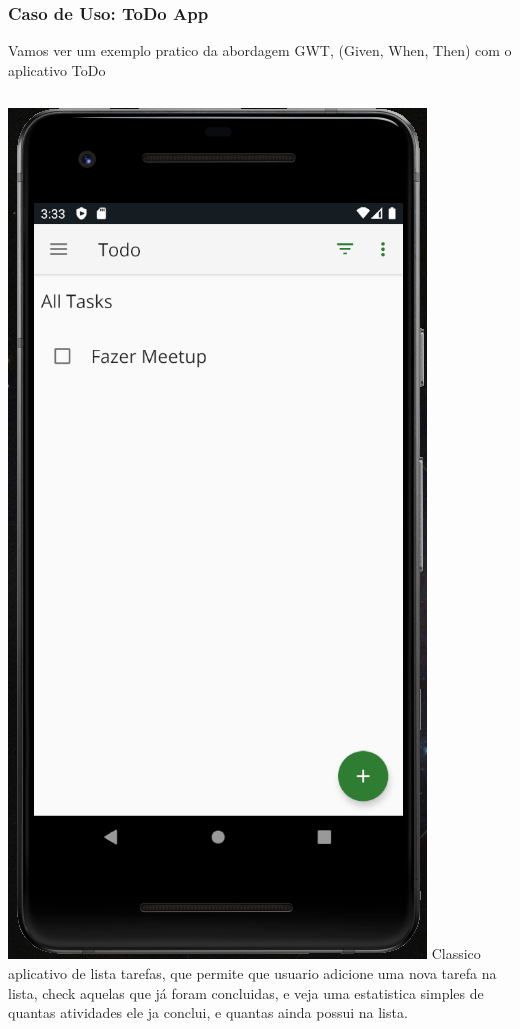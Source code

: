 \documentclass{beamer}
\begin{document}
\begin{frame}
	\frametitle{Caso de Uso: ToDo App}
	Vamos ver um exemplo pratico da abordagem GWT, (Given, When, Then) com o aplicativo ToDo
	\begin{columns}[c]
		
		\includegraphics[scale=0.3]{toDoAppSample}
		Classico aplicativo de lista tarefas, que permite que usuario adicione uma nova tarefa na lista, check aquelas que já foram concluidas, e veja uma estatistica simples de quantas atividades ele ja conclui, e quantas ainda possui na lista.
		
	\end{columns}
	
\end{frame}
\end{document}
